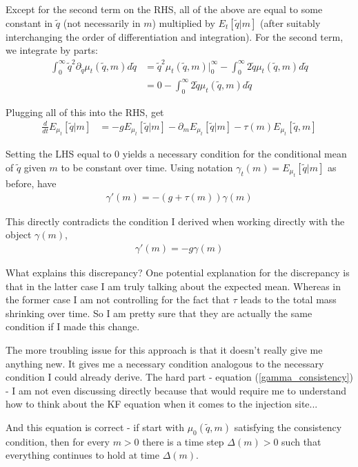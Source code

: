 \documentclass[12pt,english]{article}
\theoremstyle{remark}
\begin{document}
Except for the second term on the RHS, all of the above are equal to some constant in $\tilde{q}$ (not necessarily in $m$) multiplied by $E_t[\tilde{q}|m]$ (after suitably interchanging the order of differentiation and integration). For the second term, we integrate by parts:
\begin{align*}
	\int_0^{\infty} \tilde{q}^2 \partial_{\tilde{q}} \mu_t (\tilde{q},m) d\tilde{q} &= \tilde{q}^2 \mu_t(\tilde{q},m) \big |^{\infty}_0 - \int_0^{\infty} 2 \tilde{q} \mu_t (\tilde{q},m) d\tilde{q}\\
			   &= 0 - \int_0^{\infty} 2 \tilde{q} \mu_t (\tilde{q},m) d\tilde{q}
\end{align*}

Plugging all of this into the RHS, get
\begin{align*}
	\frac{d}{dt} E_{\mu_t}[\tilde{q}|m] &= -g E_{\mu_t} [\tilde{q}|m] - \partial_m E_{\mu_t}[\tilde{q}|m] - \tau(m)E_{\mu_t}[\tilde{q},m]
\end{align*}

Setting the LHS equal to 0 yields a necessary condition for the conditional mean of $\tilde{q}$ given $m$ to be constant over time. Using notation $\gamma_t (m) = E_{\mu_t} [\tilde{q}|m]$ as before, have
\begin{align*}
	\gamma'(m) = -(g + \tau(m)) \gamma(m)
\end{align*}

This directly contradicts the condition I derived when working directly with the object $\gamma(m)$, 
\begin{align*}
	\gamma'(m) = -g \gamma(m) 
\end{align*}

What explains this discrepancy? One potential explanation for the discrepancy is that in the latter case I am truly  talking about the expected mean. Whereas in the former case I am not controlling for the fact that $\tau$ leads to the total mass shrinking over time. So I am pretty sure that they are actually the same condition if I made this change.

The more troubling issue for this approach is that it doesn't really give me anything new. It gives me a necessary condition analogous to the necessary condition I could already derive. The hard part - equation (\ref{gamma_consistency}) - I am not even discussing directly because that would require me to understand how to think about the KF equation when it comes to the injection site...

And this equation is correct - if start with $\mu_0(\tilde{q},m)$ satisfying the consistency condition, then for every $m > 0$ there is a time step $\Delta(m) > 0$ such that everything continues to hold at time $\Delta(m)$. 
\end{document}
